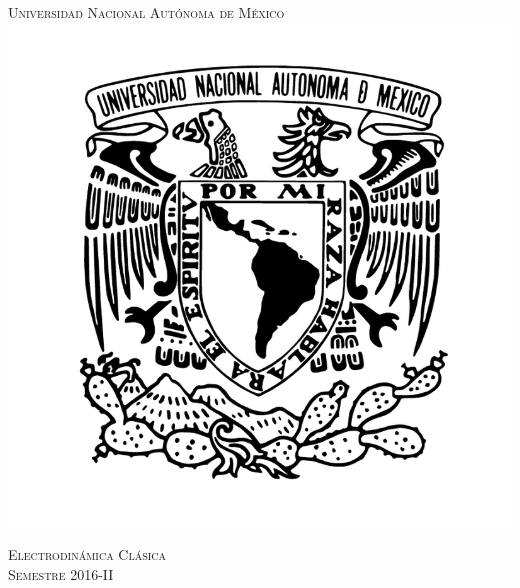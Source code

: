 \documentclass[a4paper,11pt]{article}
\numberwithin{equation}{section}
\begin{document}
\begin{titlepage}
\thispagestyle{fancy}

\newcommand{\HRule}{\rule{\linewidth}{0.5mm}} %

\center %
 

\textsc{\LARGE Universidad Nacional Autónoma de México}\\[0.3cm] %


\includegraphics[scale=0.17]{unam}


\textsc{\Large Electrodinámica Clásica}\\[0.5cm] %
\textsc{\large Semestre 2016-II}\\[0.5cm] %


\end{titlepage}
\end{document}
